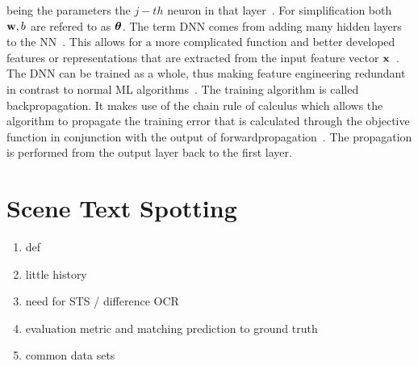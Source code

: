being the parameters the $j-th$ neuron in that layer~\citep{goodfellow_deep_2016}.
For simplification both $\textbf{w},b$ are refered to as $\boldsymbol{\theta}$.
The term \ac{DNN} comes from adding many hidden layers to the \ac{NN}~\citep{shrestha_review_2019}.
This allows for a more complicated function and better developed features or representations that
are extracted from the input feature vector $\textbf{x}$~\citep{oyedotun_deep_2015}.
The \ac{DNN} can be trained as a whole, thus making feature engineering redundant in contrast to
normal \ac{ML} algorithms~\citep{arpteg_software_2018}.
The training algorithm is called backpropagation.
It makes use of the chain rule of calculus which allows the algorithm to propagate the training
error that is calculated through the objective function in conjunction with the output of
forwardpropagation~\citep{goodfellow_deep_2016}.
The propagation is performed from the output layer back to the first layer.

\section{Scene Text Spotting}

\begin{enumerate}
    \item def
    \item little history
    \item need for \ac{STS} / difference OCR
    \item evaluation metric and matching prediction to ground truth
    \item common data sets
\end{enumerate}

